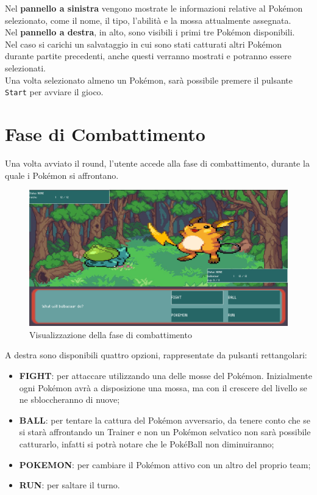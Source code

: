 \documentclass[a4paper,12pt]{report}
\begin{document}
{{Nel \textbf{pannello a sinistra} vengono mostrate le informazioni relative al Pokémon selezionato, come il nome, il tipo, l’abilità e la mossa attualmente assegnata.\\
Nel \textbf{pannello a destra}, in alto, sono visibili i primi tre Pokémon disponibili.\\
Nel caso si carichi un salvataggio in cui sono stati catturati altri Pokémon durante partite precedenti, anche questi verranno mostrati e potranno essere selezionati.\\
Una volta selezionato almeno un Pokémon, sarà possibile premere il pulsante \texttt{Start} per avviare il gioco.

\section{Fase di Combattimento}

Una volta avviato il round, l’utente accede alla fase di combattimento, durante la quale i Pokémon si affrontano.

\begin{figure}[H]
  \centering
  \includegraphics[width=\textwidth]{immagini/schermataFight.png}
  \caption{Visualizzazione della fase di combattimento}
  \label{fig:combat_phase}
\end{figure}
A destra sono disponibili quattro opzioni, rappresentate da pulsanti rettangolari:

\begin{itemize}
  \item \textbf{FIGHT}: per attaccare utilizzando una delle mosse del Pokémon. Inizialmente ogni Pokémon avrà a disposizione una mossa, ma con il crescere del livello se ne sbloccheranno di nuove;
  \item \textbf{BALL}: per tentare la cattura del Pokémon avversario, da tenere conto che se si starà affrontando un Trainer e non un Pokémon selvatico non sarà possibile catturarlo, infatti si potrà notare che le PokéBall non diminuiranno;
  \item \textbf{POKEMON}: per cambiare il Pokémon attivo con un altro del proprio team;
  \item \textbf{RUN}: per saltare il turno.
\end{itemize}

}}
\end{document}
